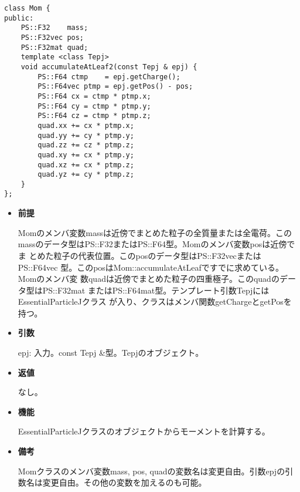 
\begin{screen}
\begin{verbatim}
class Mom {
public:
    PS::F32    mass;
    PS::F32vec pos;
    PS::F32mat quad;
    template <class Tepj>
    void accumulateAtLeaf2(const Tepj & epj) {
        PS::F64 ctmp    = epj.getCharge();
        PS::F64vec ptmp = epj.getPos() - pos;
        PS::F64 cx = ctmp * ptmp.x;
        PS::F64 cy = ctmp * ptmp.y;
        PS::F64 cz = ctmp * ptmp.z;
        quad.xx += cx * ptmp.x;
        quad.yy += cy * ptmp.y;
        quad.zz += cz * ptmp.z;
        quad.xy += cx * ptmp.y;
        quad.xz += cx * ptmp.z;
        quad.yz += cy * ptmp.z;
    }
};
\end{verbatim}
\end{screen}

\begin{itemize}

\item {\bf 前提}

  Momのメンバ変数massは近傍でまとめた粒子の全質量または全電荷。この
  massのデータ型はPS::F32またはPS::F64型。Momのメンバ変数posは近傍でま
  とめた粒子の代表位置。このposのデータ型はPS::F32vecまたはPS::F64vec
  型。このposはMom::accumulateAtLeafですでに求めている。Momのメンバ変
  数quadは近傍でまとめた粒子の四重極子。このquadのデータ型はPS::F32mat
  またはPS::F64mat型。テンプレート引数TepjにはEssentialParticleJクラス
  が入り、クラスはメンバ関数getChargeとgetPosを持つ。

\item {\bf 引数}

  epj: 入力。const Tepj \&型。Tepjのオブジェクト。
  
\item {\bf 返値}

  なし。

\item {\bf 機能}

  EssentialParticleJクラスのオブジェクトからモーメントを計算する。
  
\item {\bf 備考}

  Momクラスのメンバ変数mass, pos, quadの変数名は変更自由。引数epjの引
  数名は変更自由。その他の変数を加えるのも可能。

\end{itemize}


